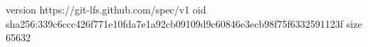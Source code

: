 version https://git-lfs.github.com/spec/v1
oid sha256:339c6ccc426f771e10fda7e1a92cb09109d9c60846e3ecb98f75f6332591123f
size 65632

